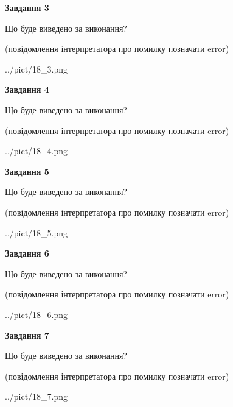 \documentclass[12pt, ukrainian]{article}
\begin{document}
{\begin {large}
{\begin {center}\textbf{Завдання 3}\end {center}}\par
Що буде виведено за виконання?\par
 (повідомлення інтерпретатора про помилку позначати error)\par
\begin{center}
	{../pict/18_3.png}
\end{center}
\newpage

{\begin {center}\textbf{Завдання 4}\end {center}}\par
Що буде виведено за виконання?\par
 (повідомлення інтерпретатора про помилку позначати error)\par
\begin{center}
	{../pict/18_4.png}
\end{center}
\newpage

{\begin {center}\textbf{Завдання 5}\end {center}}\par
Що буде виведено за виконання?\par
 (повідомлення інтерпретатора про помилку позначати error)\par
\begin{center}
	{../pict/18_5.png}
\end{center}
\newpage

{\begin {center}\textbf{Завдання 6}\end {center}}\par
Що буде виведено за виконання?\par
 (повідомлення інтерпретатора про помилку позначати error)\par
\begin{center}
	{../pict/18_6.png}
\end{center}
\newpage

{\begin {center}\textbf{Завдання 7}\end {center}}\par
Що буде виведено за виконання?\par
 (повідомлення інтерпретатора про помилку позначати error)\par
\begin{center}
	{../pict/18_7.png}
\end{center}
\newpage


\end{large}}
\end{document}

